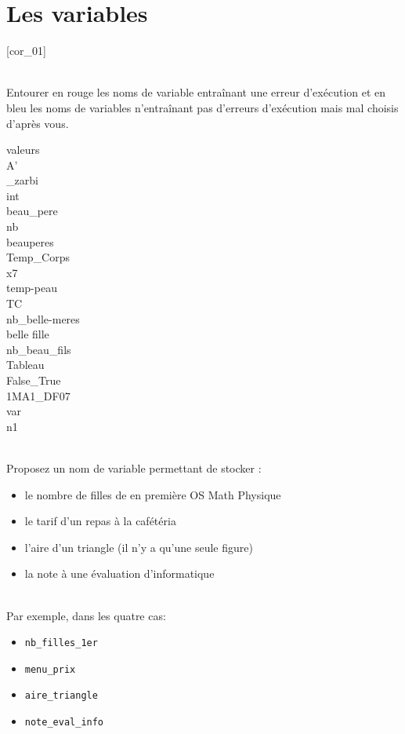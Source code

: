 \documentclass[a4paper,12pt]{article}
\newcommand{\numero}{7}                                    %
\begin{document}


\setcounter{section}{\numero}
\section{Les variables}				
[cor_01]

\exo{}  ~\\ 
 Entourer en rouge les noms de variable entraînant une erreur d’exécution et en bleu les noms de variables n’entraînant pas d’erreurs d’exécution mais mal choisis d'après vous.
\begin{multicols}{7}
	{\small
		valeurs\\
		A'\\
		\_zarbi\\
		int\\
		beau\_pere\\
		nb\\
		beauperes\\
		Temp\_Corps \\
		x7\\
		temp-peau\\
		TC\\
		nb\_belle-meres\\
		belle fille\\
		nb\_beau\_fils\\
		Tableau\\
		False\_True\\
		1MA1\_DF07\\
		var\\
		n1
	}
\end{multicols}		
\finexo

\exo{}  ~\\ 
Proposez un nom de variable permettant de stocker :
\begin{itemize}
	\item le nombre de filles de en première OS Math Physique
	\item  le tarif d’un repas à la cafétéria
	\item l’aire d’un triangle (il n’y a qu’une seule figure)
	\item la note à une évaluation d’informatique
\end{itemize}
	\begin{correction}
		~\\ 
		Par exemple, dans les quatre cas:
		\begin{itemize}
			\item \lstinline{nb_filles_1er}
			\item  \lstinline{menu_prix}
			\item  \lstinline{aire_triangle}
			\item  \lstinline{note_eval_info}
		\end{itemize}
	\end{correction}
\finexo
\end{document}
